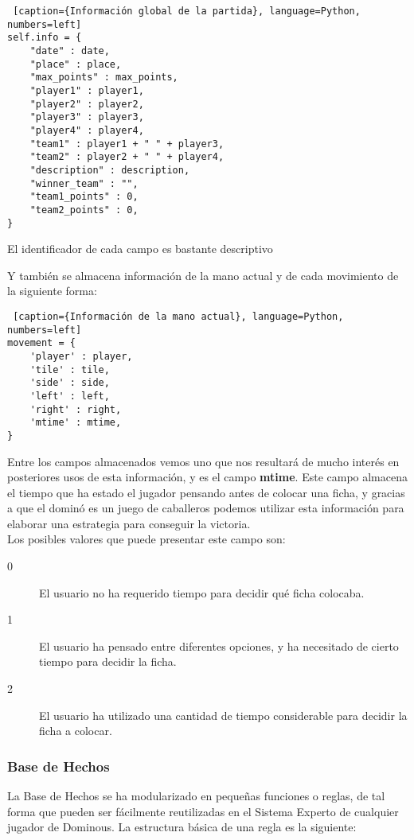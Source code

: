 \begin{lstlisting} [caption={Información global de la partida}, language=Python, numbers=left]
self.info = {
    "date" : date,
    "place" : place,
    "max_points" : max_points,
    "player1" : player1,
    "player2" : player2,
    "player3" : player3,
    "player4" : player4,
    "team1" : player1 + " " + player3,
    "team2" : player2 + " " + player4,
    "description" : description,
    "winner_team" : "",
    "team1_points" : 0,
    "team2_points" : 0,
}
\end{lstlisting}

El identificador de cada campo es bastante descriptivo

Y también se almacena información de la mano actual y de cada movimiento de la siguiente forma:

\begin{lstlisting} [caption={Información de la mano actual}, language=Python, numbers=left]
movement = {
    'player' : player,
    'tile' : tile,
    'side' : side,
    'left' : left,
    'right' : right,
    'mtime' : mtime,
}
\end{lstlisting}

Entre los campos almacenados vemos uno que nos resultará de mucho interés en posteriores usos de esta información, y es
el campo \textbf{mtime}. Este campo almacena el tiempo que ha estado el jugador pensando antes de colocar una ficha,
y gracias a que el dominó es un juego de caballeros podemos utilizar esta información para elaborar una estrategia
para conseguir la victoria. \\

Los posibles valores que puede presentar este campo son:

\begin{description}
    \item[0] El usuario no ha requerido tiempo para decidir qué ficha colocaba.
    \item[1] El usuario ha pensado entre diferentes opciones, y ha necesitado de cierto tiempo para decidir la ficha.
    \item[2] El usuario ha utilizado una cantidad de tiempo considerable para decidir la ficha a colocar.
\end{description}

\subsubsection{Base de Hechos}

La Base de Hechos se ha modularizado en pequeñas funciones o reglas, de tal forma que pueden ser fácilmente reutilizadas en
el Sistema Experto de cualquier jugador de Dominous. La estructura básica de una regla es la siguiente:

